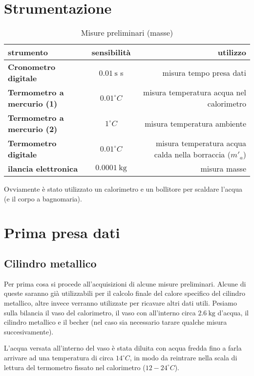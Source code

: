 \documentclass{article}
\begin{document}
	
	\section*{Strumentazione}
	\begin{table}[H] \centering
		\begin{small}
			\begin{tabular}{@{}lcr@{}}\toprule
				\textbf{strumento}& \textbf{sensibilità}& \textbf{utilizzo} \\ \midrule
				\textbf{Cronometro digitale}	&	\(0.01 \SI{}{\second}\) s &  misura tempo presa dati\\  \hdashline
				\textbf{Termometro a mercurio (1)}	& \(0.01 ^\circ C\)	 &  misura temperatura acqua nel calorimetro\\  \hdashline
				\textbf{Termometro a mercurio (2)}	& \(1 ^\circ C\)	 & misura temperatura ambiente  \\  \hdashline
				\textbf{Termometro digitale}	& \(0.01 ^\circ C\)	 &  misura temperatura acqua calda nella borraccia (\(m'_{a}\))\\  \hdashline
				\textbf{ilancia elettronica} & \(0.0001 \SI{}{\kilogram}\) & misura masse \\ \bottomrule
			\end{tabular}
		\end{small}
		\caption{Misure preliminari (masse)}
	\end{table}
	Ovviamente è stato utilizzato un calorimetro e un bollitore per scaldare l'acqua (e il corpo a bagnomaria).
	
	\newpage
	\section{Prima presa dati}
	\subsection{Cilindro metallico}
	Per prima cosa si procede all'acquisizioni di alcune misure preliminari. Alcune di queste saranno già utilizzabili per il calcolo finale del calore specifico del cilindro metallico, altre invece verranno utilizzate per ricavare altri dati utili. Pesiamo sulla bilancia il vaso del calorimetro, il vaso con all'interno circa \(2.6 \SI{}{\kilogram}\) d'acqua, il cilindro metallico e il becher (nel caso sia necessario tarare qualche misura succesivamente).
	
	L'acqua versata all'interno del vaso è stata diluita con acqua fredda fino a farla arrivare ad una temperatura di circa \(14 ^\circ C\), in modo da reintrare nella scala di lettura del termometro fissato nel calorimetro (\(12-24 ^\circ C\)).
	
\end{document}
